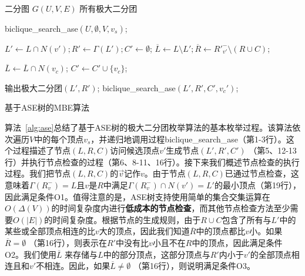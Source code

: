 \begin{algorithm}[H]
  \begin{algorithmic}[1]
      \normalsize
      \REQUIRE 二分图 $G(U,V,E)$
      \ENSURE 所有极大二分团
      
      \renewcommand{\algorithmicdo}{\textbf{do}}
        \STATE \textsf{biclique\_search\_ase}$(U,\emptyset,V,v_s)$;
      \ENDFOR

      \renewcommand{\algorithmicwhile}{\textbf{procedure}}
      \renewcommand{\algorithmicdo}{\textbf{:}}
      \renewcommand{\algorithmicdo}{\textbf{do}}
      \STATE $L' \leftarrow L \cap N(v'); R' \leftarrow \Gamma(L'); C' \leftarrow \emptyset$;
      \STATE $\overline{L}\leftarrow L \setminus L'; \overline{R}\leftarrow {R'}_{v'}^- \setminus (R \cup C)$;

              \STATE $\overline{L} \leftarrow \overline{L} \cap N(v_c)$; 
            \ENDIF
            \STATE $C' \leftarrow C' \cup \{v_c\}$;
          \ENDIF
        \ENDFOR

          \STATE 输出极大二分团$(L', R')$;
              \STATE \textsf{biclique\_search\_ase}$(L', R', C', v_c')$;
            \ENDIF
          \ENDFOR
        \ENDIF
      \ENDWHILE

  \end{algorithmic}
  \caption{基于ASE树的MBE算法}
  \label{alg:ase}
\end{algorithm}


算法~\ref{alg:ase}总结了基于ASE树的极大二分团枚举算法的基本枚举过程。该算法依次遍历$V$中的每个顶点$v_s$，并递归地调用过程\textsf{biclique\_search\_ase}（第1-3行）。这个过程描述了节点$(L,R,C)$访问候选顶点$v'$生成节点$(L',R',C')$ （第5、12-13行）并执行节点检查的过程（第6、8-11、16行）。接下来我们概述节点检查的执行过程。我们把节点$(L,R,C)$的$\vec{v}$记作$v$。由于节点$(L,R,C)$已通过节点检查，这意味着$\Gamma(R_v^-) = L$且$v$是$R$中满足$\Gamma(R_v^-) \cap N(v') = L'$的最小顶点（第19行），因此满足条件O1。值得注意的是，ASE树支持使用简单的集合交集运算在$O(\Delta(V))$的时间复杂度内进行\textbf{低成本的节点检查}，而其他节点检查方法至少需要$O(|E|)$的时间复杂度。根据节点的生成规则，由于$R \cup C$包含了所有与$L'$中的某些或全部顶点相连的比$v$大的顶点，因此我们知道$\overline{R}$中的顶点都比$v$小。如果$\overline{R} = \emptyset$ （第16行），则表示在$R'$中没有比$v$小且不在$R$中的顶点，因此满足条件O2。我们使用$\overline{L}$ 来存储与$L$中的部分顶点，这部分顶点与$R'$内小于$v'$的全部顶点相连且和$v'$不相连。因此，如果$\overline{L} \neq \emptyset$ （第16行），则说明满足条件O3。

